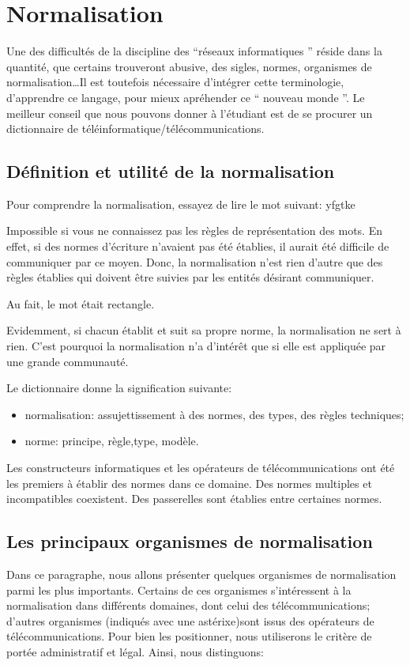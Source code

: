 \chapter{Normalisation}

Une des difficultés de la discipline des ``réseaux informatiques '' réside dans la quantité, que certains trouveront abusive, des sigles, normes, organismes de normalisation\ldots Il est toutefois nécessaire d'intégrer cette terminologie, d'apprendre ce langage, pour mieux apréhender ce `` nouveau monde ''. Le meilleur conseil que nous pouvons donner à l'étudiant est de se procurer un dictionnaire de téléinformatique/télécommunications.

\section{Définition et utilité de la normalisation}

Pour comprendre la normalisation, essayez de lire le mot suivant: yfgtke

Impossible si vous ne connaissez pas les règles de représentation des mots. En effet, si des normes d'écriture n'avaient pas été établies, il aurait été difficile de communiquer par ce moyen. Donc, la normalisation n'est rien d'autre que des règles établies qui doivent être suivies par les entités désirant communiquer.

Au fait, le mot était rectangle.

Evidemment, si chacun établit et suit sa propre norme, la normalisation ne sert à rien. C'est pourquoi la normalisation n'a d'intérêt que si elle est appliquée par une grande communauté.

Le dictionnaire donne la signification suivante:

\begin{itemize}
	\item normalisation: assujettissement à des normes, des types, des règles techniques;
	\item norme: principe, règle,type, modèle.
\end{itemize}

Les constructeurs informatiques et les opérateurs de télécommunications ont été les premiers à établir des normes dans ce domaine. Des normes multiples et incompatibles coexistent. Des passerelles sont établies entre certaines normes.

\section{Les principaux organismes de normalisation}
Dans ce paragraphe, nous allons présenter quelques organismes de normalisation parmi les plus importants. Certains de ces organismes s'intéressent à la normalisation dans différents domaines, dont celui des télécommunications; d'autres organismes (indiqués avec une astérixe)sont issus des opérateurs de télécommunications. Pour bien les positionner, nous utiliserons le critère de portée administratif et légal. Ainsi, nous distinguons:

